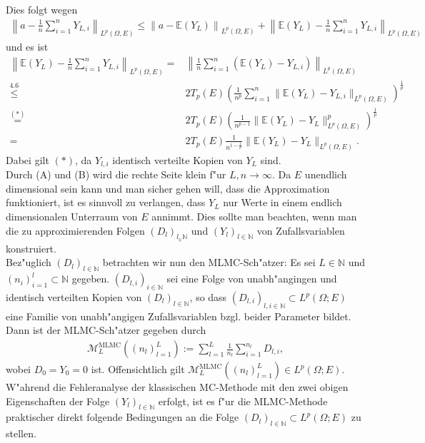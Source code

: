 Dies folgt wegen
\begin{align*}
\left \|a-\frac{1}{n}\sum_{i=1}^nY_{L,i}\right \|_{L^p(\Omega,E)}\leq\left\|a-\mathbb{E}(Y_L)\right\|_{L^p(\Omega,E)}+\left\|\mathbb{E}(Y_L)-\frac{1}{n}\sum_{i=1}^nY_{L,i}\right\|_{L^p(\Omega,E)}
\end{align*}
und es ist 
\begin{align*}
\left\| \mathbb{E}(Y_L)-\frac{1}{n}\sum_{i=1}^n Y_{L,i}\right\|_{L^p(\Omega,E)}
=&\left\|\frac{1}{n}\sum_{i=1}^n(\mathbb{E}(Y_L)-Y_{L,i})
\right\|_{L^p(\Omega,E)}\\ \stackrel{4.6}{\leq}& 2T_p(E) \left(\frac{1}{n^p}\sum_{i=1}^n \| \mathbb{E}(Y_L)-Y_{L,i}\|_{L^p(\Omega,E)}\right)^{\frac{1}{p}}\\
\overset{(*)}{=}&2T_p(E)\left(\frac{1}{n^{p-1}}\|\mathbb{E}(Y_L)-Y_L\|^p_{L^p(\Omega,E)}\right)^{\frac{1}{p}}\\
=&2T_p(E)\frac{1}{n^{1-\frac{1}{p}}}\|\mathbb{E}(Y_L)-Y_L\|_{L^p(\Omega,E)}.
\end{align*}
Dabei gilt $(*)$, da $Y_{l,i}$ identisch verteilte Kopien von $Y_L$ sind.\\
Durch (A) und (B) wird die rechte Seite klein f"ur $L,n\rightarrow \infty$. Da $E$ unendlich dimensional sein kann und man sicher gehen will, dass die Approximation funktioniert, ist es sinnvoll zu verlangen, dass $Y_L$ nur Werte in einem endlich dimensionalen Unterraum von $E$ annimmt. Dies sollte man beachten, wenn man die zu approximierenden Folgen $(D_l)_{l_\in\mathbb{N}}$ und $(Y_l)_{l\in\mathbb{N}}$ von Zufallsvariablen konstruiert.\\[1cm]
Bez"uglich $(D_l)_{l\in\mathbb{N}}$ betrachten wir nun den MLMC-Sch"atzer:
Es sei $L\in\mathbb{N}$ und $(n_i)_{i=1}^l\subset \mathbb{N}$ gegeben. $(D_{l,i})_{i\in\mathbb{N}}$ sei eine Folge von unabh"angingen und identisch verteilten Kopien von $(D_l)_{l\in\mathbb{N}}$, so dass $(D_{l,i})_{l,i \in\mathbb{N}}\subset L^p(\Omega;E)$ eine Familie von unabh"angigen Zufallsvariablen bzgl. beider Parameter bildet. Dann ist der MLMC-Sch"atzer gegeben durch
\begin{align*}
\mathcal{M}_L^{\text{MLMC}}((n_l)_{l=1}^L):=\sum_{l=1}^L\frac{1}{n_l}\sum_{i=1}^{n_l}D_{l,i},
\end{align*} wobei $D_0=Y_0=0$ ist.
Offensichtlich gilt $\mathcal{M}_L^{\text{MLMC}}((n_l)_{l=1}^L)\in L^p(\Omega;E).$\\
W"ahrend die Fehleranalyse der klassischen MC-Methode mit den zwei obigen Eigenschaften der Folge $(Y_l)_{l\in\mathbb{N}}$ erfolgt, ist es f"ur die MLMC-Methode praktischer direkt folgende Bedingungen an die Folge $(D_l)_{l\in\mathbb{N}}\subset L^p(\Omega;E)$ zu stellen.
